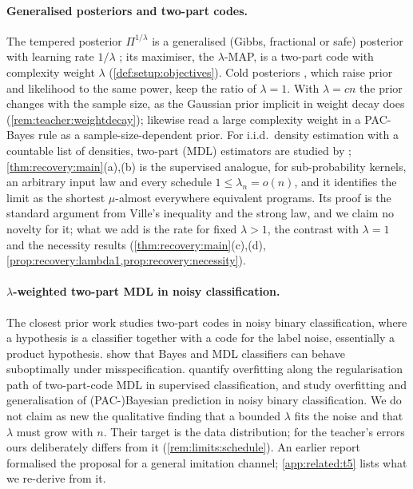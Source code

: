 \paragraph{Generalised posteriors and two-part codes.}\label{rem:related:posteriors}
The tempered posterior $\Pi^{1/\lambda}$ is a generalised (Gibbs, fractional or safe) posterior with learning rate $1/\lambda$ \citep{zhang2006epsilon,bissiri2016general,bhattacharya2019fractional,grunwald2012safe,grunwald2017inconsistency}; its maximiser, the $\lambda$-MAP, is a two-part code with complexity weight $\lambda$ (\cref{def:setup:objectives}). Cold posteriors \citep{wenzel2020good}, which raise prior and likelihood to the same power, keep the ratio of $\lambda=1$.\label{rem:related:cold} With $\lambda=cn$ the prior changes with the sample size, as the Gaussian prior implicit in weight decay does (\cref{rem:teacher:weightdecay}); \citet{zhu2026overfitting} likewise read a large complexity weight in a PAC-Bayes rule as a sample-size-dependent prior. For i.i.d.\ density estimation with a countable list of densities, two-part (MDL) estimators are studied by \citet{barron1991minimum}; \cref{thm:recovery:main}(a),(b) is the supervised analogue, for sub-probability kernels, an arbitrary input law and every schedule $1\le\lambda_n=o(n)$, and it identifies the limit as the shortest $\mu$-almost everywhere equivalent programs. Its proof is the standard argument from Ville's inequality and the strong law, and we claim no novelty for it; what we add is the rate for fixed $\lambda>1$, the contrast with $\lambda=1$ and the necessity results (\cref{thm:recovery:main}(c),(d), \cref{prop:recovery:lambda1,prop:recovery:necessity}).

\paragraph{$\lambda$-weighted two-part MDL in noisy classification.}\label{rem:related:mdl}
The closest prior work studies two-part codes in noisy binary classification, where a hypothesis is a classifier together with a code for the label noise, essentially a product hypothesis. \citet{grunwald2007suboptimal} show that Bayes and MDL classifiers can behave suboptimally under misspecification. \citet{zhu2025quantifying} quantify overfitting along the regularisation path of two-part-code MDL in supervised classification, and \citet{zhu2026overfitting} study overfitting and generalisation of (PAC-)Bayesian prediction in noisy binary classification. We do not claim as new the qualitative finding that a bounded $\lambda$ fits the noise and that $\lambda$ must grow with $n$. Their target is the data distribution; for the teacher's errors ours deliberately differs from it (\cref{rem:limits:schedule}). An earlier report \citep[Section~8]{claude2026whatfollows} formalised the proposal for a general imitation channel; \cref{app:related:t5} lists what we re-derive from it.

